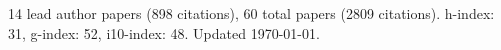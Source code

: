 14 lead author papers (898 citations),
60 total papers (2809 citations).\newline
h-index: 31, g-index: 52, i10-index: 48. Updated \today.